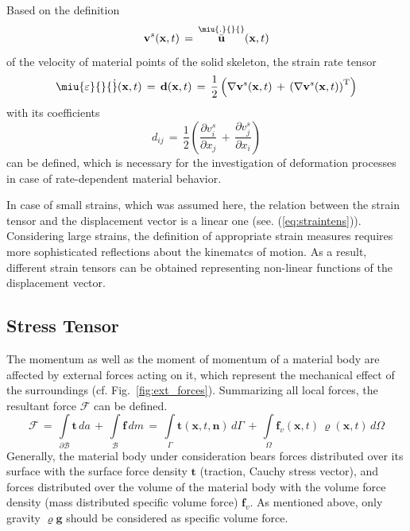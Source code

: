 Based on the definition
\begin{equation}
\mathbf{v}^s(\mathbf{x},t)\,=\,\mathop{\bar{\mathbf{u}}}\limits^{\miu{.}{}{}}(\mathbf{x},t)
\label{eq:solidveloc}
\end{equation}
of the velocity of material points of the solid skeleton, the strain rate tensor
\begin{equation}
\miu{\varepsilon}{}{\dot}(\mathbf{x},t)\,=\,\mathbf{d}(\mathbf{x},t)\,=\,\frac{1}{2}
\left(\nabla\mathbf{v}^s(\mathbf{x},t)\,+\,\left(\nabla\mathbf{v}^s(\mathbf{x},t)\right)^{\mathrm{T}}\right)
\label{eq:strainratetens}
\end{equation}
with its coefficients
\begin{equation}
d_{ij}\,=\,
\frac{1}{2}\left(\frac{\partial v^s_i}{\partial x_j}\,+\,\frac{\partial v^s_j}{\partial x_i}\right)
\label{eq:strainratecoeff}
\end{equation}
can be defined, which is necessary for the investigation of deformation processes in case of rate-dependent material behavior.

In case of small strains, which was assumed here, the relation between the strain tensor and the displacement vector is a linear one (see. (\ref{eq:straintens})). Considering large strains, the definition of appropriate strain measures requires more sophisticated reflections about the kinematcs of motion. As a result, different strain tensors can be obtained representing non-linear functions of the displacement vector. 

\newpage
\subsection{Stress Tensor}
\label{sec:stresstensor}

The momentum as well as the moment of momentum of a material body are affected by external forces acting on it, which represent the mechanical effect of the surroundings (cf. Fig.~\ref{fig:ext_forces}). Summarizing all local forces, the resultant force $\mathcal{F}$ can be defined.
\begin{equation}
\mathcal{F}\,=\,
\int\limits_{\partial\mathcal{B}}\mathbf{t}\,da\,+\,\int\limits_{\mathcal{B}}\mathbf{f}\,dm\,=\,
\int\limits_{\Gamma}\mathbf{t}(\mathbf{x},t,\mathbf{n})\,d\Gamma\,+\,
\int\limits_{\Omega}\mathbf{f}_v(\mathbf{x},t)\,\varrho(\mathbf{x},t)\,d\Omega
\label{eq:result_force}
\end{equation}
Generally, the material body under consideration bears forces distributed over its surface with the surface force
density $\mathbf{t}$ (traction, Cauchy stress vector), and forces distributed over the volume of the material body with the volume force density (mass distributed specific volume force) $\mathbf{f}_v$. As mentioned above, only gravity $\varrho\mathbf{g}$ should be considered as specific volume force.

